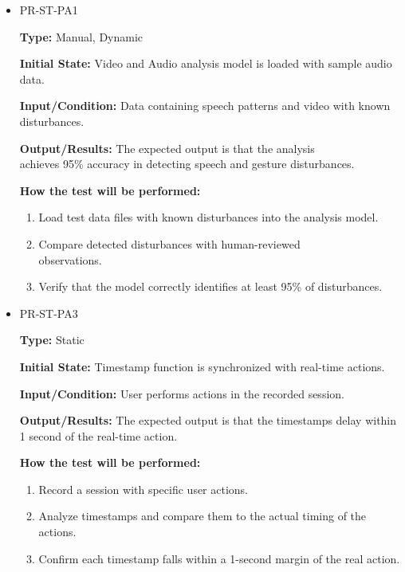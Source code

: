 \documentclass[12pt, titlepage]{article}
\begin{document}
\begin{itemize}
  \item PR-ST-PA1
  \begin{mdframed}[linewidth=0.5mm]
      \textbf{Type:} Manual, Dynamic \par
      \textbf{Initial State:} Video and Audio analysis model is loaded with sample audio data. \par
      \textbf{Input/Condition:} Data containing speech patterns and video with known disturbances. \par
      \textbf{Output/Results:} The expected output is that the analysis \\achieves 95\% accuracy in detecting speech and gesture disturbances. \par
      \textbf{How the test will be performed:}
      \begin{enumerate}[noitemsep]
        \item Load test data files with known disturbances into the analysis model.
        \item Compare detected disturbances with human-reviewed \\observations.
        \item Verify that the model correctly identifies at least 95\% of disturbances.
      \end{enumerate}
  \end{mdframed}
  \item PR-ST-PA3
  \begin{mdframed}[linewidth=0.5mm]
      \textbf{Type:} Static \par
      \textbf{Initial State:} Timestamp function is synchronized with real-time actions. \par
      \textbf{Input/Condition:} User performs actions in the recorded session. \par
      \textbf{Output/Results:} The expected output is that the timestamps delay within 1 second of the real-time action. \par
      \textbf{How the test will be performed:}
      \begin{enumerate}[noitemsep]
        \item Record a session with specific user actions.
        \item Analyze timestamps and compare them to the actual timing of the actions.
        \item Confirm each timestamp falls within a 1-second margin of the real action.
      \end{enumerate}

\end{mdframed}
\end{itemize}
\end{document}
